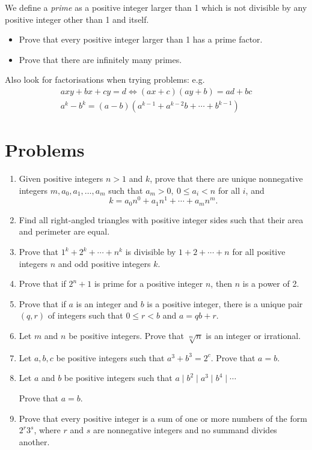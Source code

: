 \documentclass{article}
\begin{document}
  We define a \emph{prime} as a positive integer larger than 1 which is not
  divisible by any positive integer other than 1 and itself.
  \begin{itemize}
    \item Prove that every positive integer larger than 1 has a prime factor.
    \item Prove that there are infinitely many primes.
  \end{itemize}
Also look for factorisations when trying problems: e.g.
\begin{align*}
  axy+bx+cy=d\iff (ax+c)(ay+b)=ad+bc \\
  a^k-b^k=(a-b)\left(a^{k-1}+a^{k-2}b+\cdots+b^{k-1}\right)
\end{align*}
\section{Problems}
  \begin{enumerate}
    \item Given positive integers $n>1$ and $k$, prove that there are unique
      nonnegative integers $m,a_0,a_1,\ldots,a_m$ such that $a_m>0,\ 0\le
      a_i<n$ for all $i$, and
      \[k=a_0 n^0+a_1 n^1+\cdots+a_m n^m.\]
    \item Find all right-angled triangles with positive integer sides 
      such that their area and perimeter are equal.
    \item Prove that $1^k+2^k+\cdots+n^k$ is divisible by $1+2+\cdots+n$ for
      all positive integers $n$ and odd positive integers $k$.
    \item Prove that if $2^n+1$ is prime for a positive integer $n$, then $n$ is
      a power of 2.
    \item Prove that if $a$ is an integer and $b$ is a positive integer, there
      is a unique pair $(q,r)$ of integers such that $0\le r<b$ and $a=qb+r$.
    \item Let $m$ and $n$ be positive integers. Prove that $\sqrt[m]n$ is an
      integer or irrational.
    \item Let $a,b,c$ be positive integers such that $a^3+b^3=2^c$. Prove that
      $a=b$.
    \item Let $a$ and $b$ be positive integers such that $a\mid b^2\mid a^3\mid
      b^4\mid\cdots$

      Prove that $a=b$.
    \item Prove that every positive integer is a sum of one or more numbers of
      the form $2^r3^s$, where $r$ and $s$ are nonnegative integers and no
      summand divides another.
  \end{enumerate}
\newpage
\end{document}
